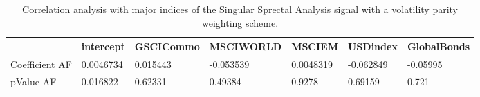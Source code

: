 \begin{table}[H]
\centering
\begin{tabular}{lllllll}
\hline& intercept & GSCICommo & MSCIWORLD & MSCIEM & USDindex & GlobalBonds \\ 
\hline 
Coefficient AF & 0.0046734 & 0.015443 & -0.053539 & 0.0048319 & -0.062849 & -0.05995 \\ 
pValue AF & 0.016822 & 0.62331 & 0.49384 & 0.9278 & 0.69159 & 0.721 \\ 
\hline
\end{tabular}
\caption{Correlation analysis with major indices of the Singular Sprectal Analysis signal with a volatility parity weighting scheme.}
\label{SSA_AFACTOR}
\end{table}